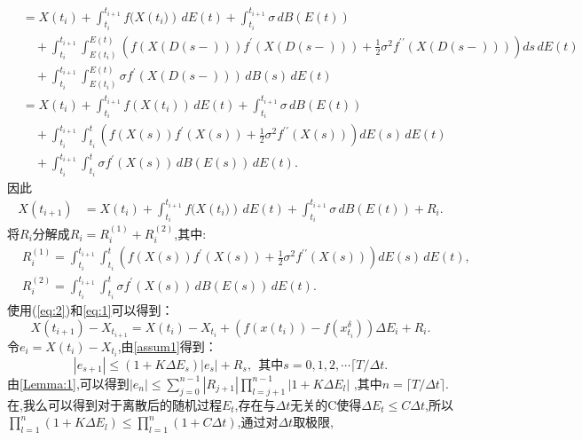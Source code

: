 \documentclass[12pt,final]{article}
\makeatletter
\numberwithin{equation}{section}
\numberwithin{figure}{section}
\numberwithin{table}{section}
\theoremstyle{plain}
\renewcommand{\proofname}{证明}
\theoremstyle{Definition}
\theoremstyle{Remark}
\renewenvironment{proof}[1][\proofname]{\par
	\pushQED{\qed}%
	\normalfont \topsep6\p@\@plus6\p@\relax
	\trivlist\item[\hskip\labelsep
	\bfseries #1\@addpunct{\,:\,}]\ignorespaces
}{%
	\popQED\endtrivlist\@endpefalse
}
\makeatother
\begin{document}
\begin{proof}
\begin{align*}
			&= X(t_i) + \int_{t_i}^{t_{i+1}} f(X({t_i)}) \,dE(t) + \int_{t_i}^{t_{i+1}} \sigma \,dB(E(t)) \\
			&\quad + \int_{t_i}^{t_{i+1}} \int_{E(t_i)}^{E(t)} \left( f(X(D(s-))) f^{\prime}(X(D(s-))) + \frac{1}{2} \sigma^2 f^{\prime\prime}(X(D(s-))) \right) ds \,dE(t) \\
			&\quad + \int_{t_i}^{t_{i+1}} \int_{E(t_i)}^{E(t)}\sigma f^{\prime}(X(D(s-))) \,dB(s) \,dE(t)\\
			&= X(t_i) + \int_{t_i}^{t_{i+1}} f(X({t_i})) \,dE(t) + \int_{t_i}^{t_{i+1}} \sigma \,dB(E(t)) \\
			&\quad + \int_{t_i}^{t_{i+1}} \int_{t_i}^{t} \left( f(X(s)) f^{\prime}(X(s)) + \frac{1}{2} \sigma^2 f^{\prime\prime}(X(s)) \right) dE(s) \,dE(t) \\
			&\quad + \int_{t_i}^{t_{i+1}} \int_{t_i}^{t}\sigma f^{\prime}(X(s)) \,dB(E(s)) \,dE(t).
		\end{align*}
		因此
		\begin{align}\label{eq:2}
			X(t_{i+1})
			&= X(t_i) + \int_{t_i}^{t_{i+1}} f(X({t_i)}) \,dE(t) + \int_{t_i}^{t_{i+1}} \sigma \,dB(E(t)) + R_i.
		\end{align}
		将$R_i$分解成$R_i = R_i^{(1)} + R_i^{(2)}$,其中:
		\begin{align*}
			& R_i^{(1)} = \int_{t_i}^{t_{i+1}} \int_{t_i}^{t} \left( f(X(s)) f^{\prime}(X(s)) + \frac{1}{2} \sigma^2 f^{\prime\prime}(X(s)) \right) dE(s) \,dE(t), \\
			& R_i^{(2)} = \int_{t_i}^{t_{i+1}} \int_{t_i}^{t} \sigma f^{\prime}(X(s)) \,dB(E(s)) \,dE(t).
		\end{align*}
		使用(\ref{eq:2})和\eqref{eq:1}可以得到：
		\begin{equation}
			X({t_{i+1}})-X_{t_{i+1}}=X({t_i})-X_{t_i}+(f{(x({t_i}))}-f{(x^\delta_{t_i})})\Delta E_{i}+R_{i}.
		\end{equation}
		令$e_i = X({t_i})-X_{t_i}$,由\cref{assum1}得到：
		\begin{equation}
			|e_{s+1}|\leq(1+K{\Delta}E_{s})|e_{s}|+R_{s},~~\text{其中}s=0,1,2,\cdots \lceil T/\Delta t .
		\end{equation}
		由\cref{Lemma:1},可以得到$|e_n| \leq \sum\limits_{j=0}^{n-1}|R_{j+1}|\prod_{l=j+1}^{n-1}|1+K\Delta E_l|$
		,其中$n = \lceil T/\Delta t \rceil$.\\
		在\cite{li2023convergence},我么可以得到对于离散后的随机过程$E_t$,存在与$\Delta t$无关的C使得$\Delta E_t \le C \Delta t$,所以$\prod\limits_{l=1}^{n}(1+K\Delta E_l) \le \prod\limits_{l=1}^{n}(1+C\Delta t)$,通过对$\Delta t$取极限,

\end{proof}
\end{document}
